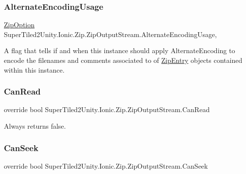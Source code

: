 \subsubsection{\texorpdfstring{Alternate\+Encoding\+Usage}{AlternateEncodingUsage}}
{\footnotesize\ttfamily \mbox{\hyperlink{namespace_super_tiled2_unity_1_1_ionic_1_1_zip_a25d431031427c142eba970006eee630c}{Zip\+Option}} Super\+Tiled2\+Unity.\+Ionic.\+Zip.\+Zip\+Output\+Stream.\+Alternate\+Encoding\+Usage\hspace{0.3cm}{\ttfamily [get]}, {\ttfamily [set]}}



A flag that tells if and when this instance should apply Alternate\+Encoding to encode the filenames and comments associated to of \mbox{\hyperlink{class_super_tiled2_unity_1_1_ionic_1_1_zip_1_1_zip_entry}{Zip\+Entry}} objects contained within this instance. 

\mbox{\label{class_super_tiled2_unity_1_1_ionic_1_1_zip_1_1_zip_output_stream_a36555d45a504b89f5889813fc30e70d3}} 
\subsubsection{\texorpdfstring{Can\+Read}{CanRead}}
{\footnotesize\ttfamily override bool Super\+Tiled2\+Unity.\+Ionic.\+Zip.\+Zip\+Output\+Stream.\+Can\+Read\hspace{0.3cm}{\ttfamily [get]}}



Always returns false. 

\mbox{\label{class_super_tiled2_unity_1_1_ionic_1_1_zip_1_1_zip_output_stream_a7f9b59591fb70d15dea656f96dcf6f72}} 
\subsubsection{\texorpdfstring{Can\+Seek}{CanSeek}}
{\footnotesize\ttfamily override bool Super\+Tiled2\+Unity.\+Ionic.\+Zip.\+Zip\+Output\+Stream.\+Can\+Seek\hspace{0.3cm}{\ttfamily [get]}}



